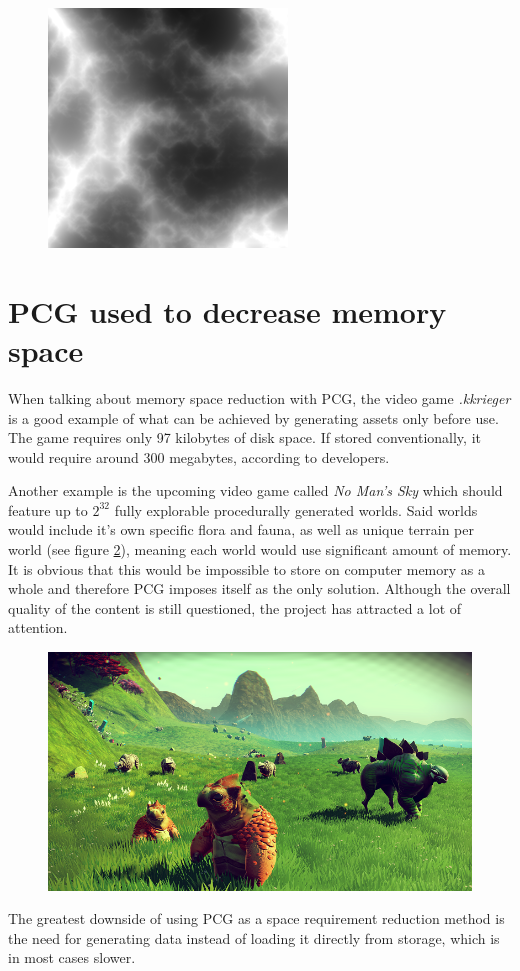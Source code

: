 \documentclass[journal]{IEEEtran}
\begin{document}
\begin{figure}[H]
	\centering
	\includegraphics[width=.6\linewidth]{ridgedMultifractal.png}
	\label{fig:ridgedMultifractal}
\end{figure}

\section{PCG used to decrease memory space}
When talking about memory space reduction with PCG, the video game \textit{.kkrieger} is a good example of what can be achieved by generating assets only before use. The game requires only 97 kilobytes of disk space. If stored conventionally, it would require around 300 megabytes, according to developers.
\par
Another example is the upcoming video game called \textit{No Man's Sky} which should feature up to $2^{32}$ fully explorable procedurally generated worlds. Said worlds would include it's own specific flora and fauna, as well as unique terrain per world (see figure \ref{fig:nomansky}), meaning each world would use significant amount of memory. It is obvious that this would be impossible to store on computer memory as a whole and therefore PCG imposes itself as the only solution. Although the overall quality of the content is still questioned, the project has attracted a lot of attention.
\begin{figure}[H]
	\centering
	\includegraphics[width=.8\linewidth]{NoMansSky.png}
	\label{fig:nomansky}
\end{figure}
\par
The greatest downside of using PCG as a space requirement reduction method is the need for generating data instead of loading it directly from storage, which is in most cases slower.
\end{document}
